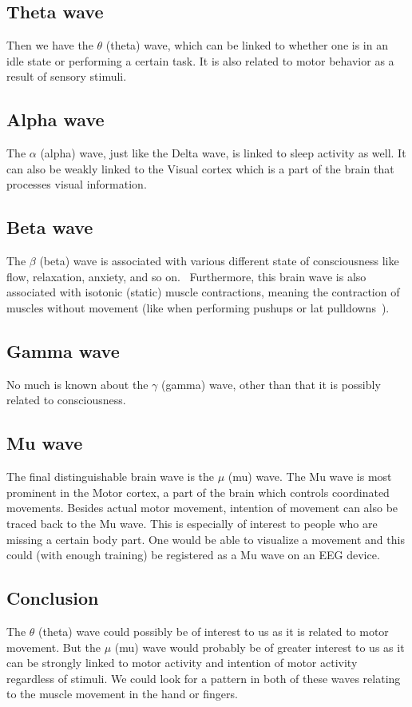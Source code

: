 \documentclass[11pt,a4paper]{article}
\begin{document}
\subsection{Theta wave}
Then we have the $\theta$ (theta) wave, which can be linked to whether one is in
an idle state or performing a certain task. It is also related to motor behavior
as a result of sensory stimuli.~\cite{theta}

\subsection{Alpha wave}
The $\alpha$ (alpha) wave, just like the Delta wave, is linked to sleep activity
as well. It can also be weakly linked to the Visual cortex which is a part of
the brain that processes visual information.~\cite{alpha}

\subsection{Beta wave}
The $\beta$ (beta) wave is associated with various different state of
consciousness like flow, relaxation, anxiety, and so on.~\cite{flow}
Furthermore, this brain wave is also associated with isotonic (static) muscle
contractions, meaning the contraction of muscles without movement (like when
performing pushups or lat pulldowns~\cite{isotonic}).~\cite{beta}

\subsection{Gamma wave}
No much is known about the $\gamma$ (gamma) wave, other than that it is possibly
related to consciousness.~\cite{gamma}

\subsection{Mu wave}
The final distinguishable brain wave is the $\mu$ (mu) wave. The Mu wave is most
prominent in the Motor cortex, a part of the brain which controls coordinated
movements. Besides actual motor movement, intention of movement can also be
traced back to the Mu wave. This is especially of interest to people who are
missing a certain body part. One would be able to visualize a movement and this
could (with enough training) be registered as a Mu wave on an EEG
device.~\cite{mu}

\subsection{Conclusion}
The $\theta$ (theta) wave could possibly be of interest to us as it is related
to motor movement. But the $\mu$ (mu) wave would probably be of greater interest
to us as it can be strongly linked to motor activity and intention of motor
activity regardless of stimuli.
We could look for a pattern in both of these waves relating to the muscle
movement in the hand or fingers.
\end{document}
